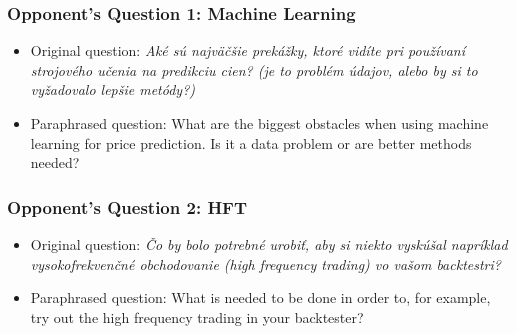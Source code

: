 



\appendix{}
\begin{frame}
  \frametitle{Opponent's Question 1: Machine Learning}
  \begin{itemize}
      \item Original question: \emph{Aké sú najväčšie prekážky, ktoré vidíte pri používaní strojového učenia na predikciu cien? (je to problém údajov, alebo by si to vyžadovalo lepšie metódy?)}
      \item Paraphrased question: What are the biggest obstacles when using machine learning for price prediction. Is it a data problem or are better methods needed?
  \end{itemize}
  \bigskip
\end{frame}

\begin{frame}
  \frametitle{Opponent's Question 2: HFT}
  \begin{itemize}
    \item Original question: \emph{Čo by bolo potrebné urobiť, aby si niekto vyskúšal napríklad vysokofrekvenčné obchodovanie (high frequency trading) vo vašom backtestri?}
      \item Paraphrased question: What is needed to be done in order to, for example, try out the high frequency trading in your backtester?
  \end{itemize}
  \bigskip
\end{frame}
